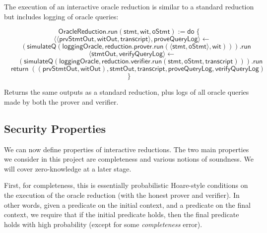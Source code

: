\begin{definition}
    \label{def:oracle_reduction_run}
    The execution of an interactive oracle reduction is similar to a standard reduction but includes logging of oracle queries:

    \[ \mathsf{OracleReduction}.\mathsf{run}(\mathsf{stmt}, \mathsf{wit}, \mathsf{oStmt}) := \mathsf{do} \; \{ \]
    \[ \quad \langle \langle \mathsf{prvStmtOut}, \mathsf{witOut}, \mathsf{transcript} \rangle, \mathsf{proveQueryLog} \rangle \leftarrow \]
    \[ \qquad (\mathsf{simulateQ}(\mathsf{loggingOracle}, \mathsf{reduction}.\mathsf{prover}.\mathsf{run}(\langle \mathsf{stmt}, \mathsf{oStmt} \rangle, \mathsf{wit}))).\mathsf{run} \]
    \[ \quad \langle \mathsf{stmtOut}, \mathsf{verifyQueryLog} \rangle \leftarrow \]
    \[ \qquad (\mathsf{simulateQ}(\mathsf{loggingOracle}, \mathsf{reduction}.\mathsf{verifier}.\mathsf{run}(\mathsf{stmt}, \mathsf{oStmt}, \mathsf{transcript}))).\mathsf{run} \]
    \[ \quad \mathsf{return} \; ((\mathsf{prvStmtOut}, \mathsf{witOut}), \mathsf{stmtOut}, \mathsf{transcript}, \mathsf{proveQueryLog}, \mathsf{verifyQueryLog}) \]
    \[ \} \]

    Returns the same outputs as a standard reduction, plus logs of all oracle queries made by both the prover and verifier.
\end{definition}

\subsection{Security Properties}\label{sec:security}

We can now define properties of interactive reductions. The two main properties we consider in this
project are completeness and various notions of soundness. We will cover zero-knowledge at a later
stage.

First, for completeness, this is essentially probabilistic Hoare-style conditions on the execution
of the oracle reduction (with the honest prover and verifier). In other words, given a predicate on
the initial context, and a predicate on the final context, we require that if the initial predicate
holds, then the final predicate holds with high probability (except for some \emph{completeness}
error).

\begin{definition}[Completeness]
    \label{def:completeness}
\end{definition}

